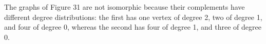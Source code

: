 \label{ch2ex:24}

The graphs of Figure 31 are not isomorphic because their complements have
different degree distributions: the first has one vertex of degree 2, two of
degree 1, and four of degree 0, whereas the second has four of degree 1, and
three of degree 0.

\begin{marginfigure}[-5em]
\end{marginfigure}
